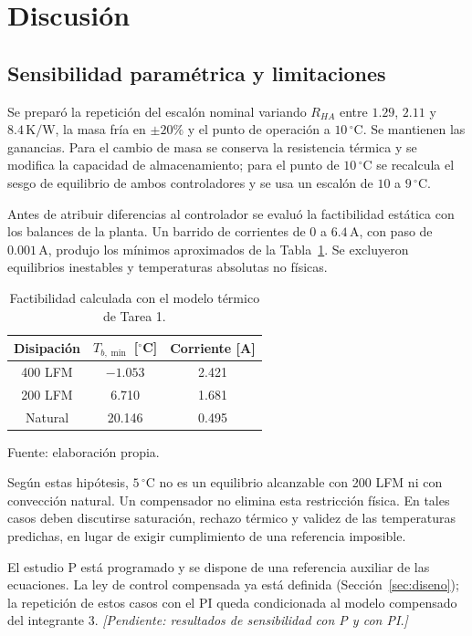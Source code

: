 \documentclass[journal,twocolumn]{IEEEtran}
\newcommand{\pendiente}[1]{\textit{[Pendiente: #1]}}
\begin{document}
\section{Discusión}\label{sec:discusion}
\subsection{Sensibilidad paramétrica y limitaciones}\label{sec:sensibilidad}
Se preparó la repetición del escalón nominal variando $R_{HA}$ entre $1.29$, $2.11$ y $8.4\,\mathrm{K/W}$, la masa fría en $\pm20\%$ y el punto de operación a $10\,{}^\circ\mathrm C$. Se mantienen las ganancias. Para el cambio de masa se conserva la resistencia térmica y se modifica la capacidad de almacenamiento; para el punto de $10\,{}^\circ\mathrm C$ se recalcula el sesgo de equilibrio de ambos controladores y se usa un escalón de $10$ a $9\,{}^\circ\mathrm C$.

Antes de atribuir diferencias al controlador se evaluó la factibilidad estática con los balances de la planta. Un barrido de corrientes de $0$ a $6.4\,\mathrm A$, con paso de $0.001\,\mathrm A$, produjo los mínimos aproximados de la Tabla~\ref{tab:factibilidad}. Se excluyeron equilibrios inestables y temperaturas absolutas no físicas.

\begin{table}[!tbp]\centering
\caption{Factibilidad calculada con el modelo térmico de Tarea 1.}
\label{tab:factibilidad}
\footnotesize
\begin{tabular}{@{}ccc@{}}\toprule
Disipación&$T_{b,\min}$ [$^\circ$C]&Corriente [A]\\\midrule
400 LFM&$-1.053$&2.421\\
200 LFM&6.710&1.681\\
Natural&20.146&0.495\\\bottomrule
\end{tabular}
\par\smallskip\footnotesize Fuente: elaboración propia.
\end{table}
Según estas hipótesis, $5\,{}^\circ\mathrm C$ no es un equilibrio alcanzable con 200 LFM ni con convección natural. Un compensador no elimina esta restricción física. En tales casos deben discutirse saturación, rechazo térmico y validez de las temperaturas predichas, en lugar de exigir cumplimiento de una referencia imposible.

El estudio P está programado y se dispone de una referencia auxiliar de las ecuaciones. La ley de control compensada ya está definida (Sección~\ref{sec:diseno}); la repetición de estos casos con el PI queda condicionada al modelo compensado del integrante 3. \pendiente{resultados de sensibilidad con P y con PI.}
\end{document}
